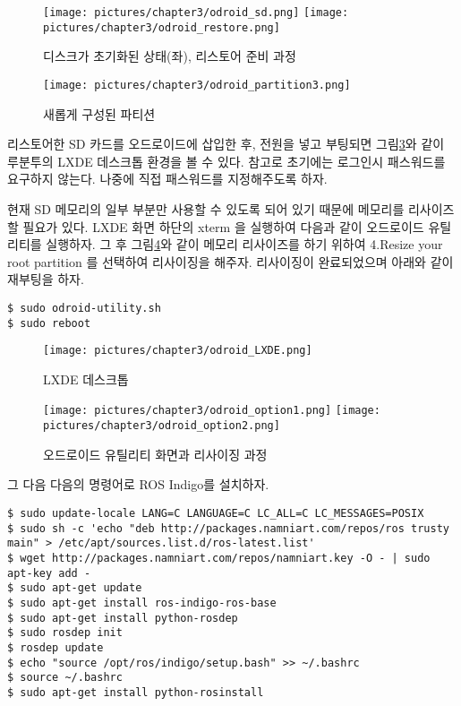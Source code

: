 \begin{figure}[h]
\centering
\texttt{[image: pictures/chapter3/odroid\_sd.png]}
\texttt{[image: pictures/chapter3/odroid\_restore.png]}
\caption{디스크가 초기화된 상태(좌), 리스토어 준비 과정}
\label{fig:partition_restore}
\end{figure}


\begin{figure}[h]
\centering
\texttt{[image: pictures/chapter3/odroid\_partition3.png]}
\caption{새롭게 구성된 파티션}
\label{fig:lubuntu_partition_new}
\end{figure}

리스토어한 SD 카드를 오드로이드에 삽입한 후, 전원을 넣고 부팅되면 그림\ref{fig:lxde}와 같이 루분투의 LXDE 데스크톱 환경을 볼 수 있다. 참고로 초기에는 로그인시 패스워드를 요구하지 않는다. 나중에 직접 패스워드를 지정해주도록 하자.

현재 SD 메모리의 일부 부분만 사용할 수 있도록 되어 있기 때문에 메모리를 리사이즈 할 필요가 있다. LXDE 화면 하단의 xterm 을 실행하여 다음과 같이 오드로이드 유틸리티를 실행하자. 그 후 그림\ref{fig:odroid_utility}와 같이 메모리 리사이즈를 하기 위하여 4.Resize your root partition 를 선택하여 리사이징을 해주자. 리사이징이 완료되었으며 아래와 같이 재부팅을 하자.

\vspace{\baselineskip}
\begin{lstlisting}[language=ROS]
$ sudo odroid-utility.sh 
$ sudo reboot 
\end{lstlisting}

\begin{figure}[h]
\centering\texttt{[image: pictures/chapter3/odroid\_LXDE.png]}
\caption{LXDE 데스크톱}
\label{fig:lxde}
\end{figure}

\begin{figure}[h]
\centering
\texttt{[image: pictures/chapter3/odroid\_option1.png]}
\texttt{[image: pictures/chapter3/odroid\_option2.png]}
\caption{오드로이드 유틸리티 화면과 리사이징 과정}
\label{fig:odroid_utility}
\end{figure}

\newpage

그 다음 다음의 명령어로 ROS Indigo를 설치하자.

\vspace{\baselineskip}
\begin{lstlisting}[language=ROS]
$ sudo update-locale LANG=C LANGUAGE=C LC_ALL=C LC_MESSAGES=POSIX
$ sudo sh -c 'echo "deb http://packages.namniart.com/repos/ros trusty main" > /etc/apt/sources.list.d/ros-latest.list'
$ wget http://packages.namniart.com/repos/namniart.key -O - | sudo apt-key add -
$ sudo apt-get update
$ sudo apt-get install ros-indigo-ros-base
$ sudo apt-get install python-rosdep
$ sudo rosdep init
$ rosdep update
$ echo "source /opt/ros/indigo/setup.bash" >> ~/.bashrc
$ source ~/.bashrc
$ sudo apt-get install python-rosinstall
\end{lstlisting}

